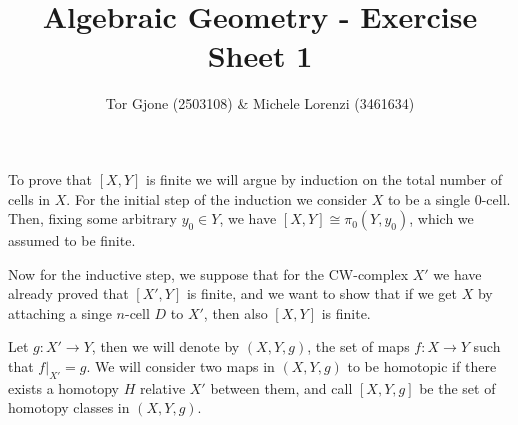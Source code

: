 \documentclass[a4paper,11pt,english]{article}
\title{\textbf{Algebraic Geometry} - Exercise Sheet 1}
\author{Tor Gjone (2503108) \& Michele Lorenzi (3461634)}
\begin{document}
\mmaketitle

\begin{exercise}[1]

To prove that $[X,Y]$ is finite we will argue by induction on the total number of cells in $X$. For the initial step of the induction we consider $X$ to be a single $0$-cell. Then, fixing some arbitrary $y_0 \in Y$, we  have $[X,Y] \cong \pi_0(Y,y_0)$, which we 
assumed to be finite. 

Now for the inductive step, we suppose that for the CW-complex $X'$ we have already proved that $[X',Y]$ is finite, and we want to show that if we get $X$ by attaching a singe $n$-cell $D$ to $X'$, then also $[X,Y]$ is finite.

Let $g : X' \to Y$, then we will denote by $(X,Y,g)$, the set of maps $f: X \to Y$ such that $f|_{X'} = g$. 
We will consider two maps in $(X,Y,g)$ to be homotopic if there exists a homotopy $H$ relative $X'$ between them, and call $[X,Y,g]$ be the set of homotopy classes in $(X,Y,g)$.


\end{exercise}
\end{document}
